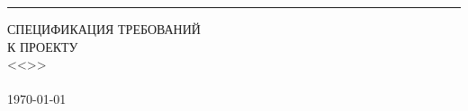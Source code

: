 \documentclass{scrreprt}
\begin{document}
\begin{flushright}
    \rule{16cm}{5pt}\vskip1cm
    \begin{bfseries}
        \Huge{СПЕЦИФИКАЦИЯ ТРЕБОВАНИЙ\\ К ПРОЕКТУ}\\
        \vspace{3.0cm}
        \huge{<<\vProjectName>>}\\
        \vspace*{\fill}
        \LARGE{\vCurrentVersion}\\
        \today\\
    \end{bfseries}
\end{flushright}

\tableofcontents







\end{document}
